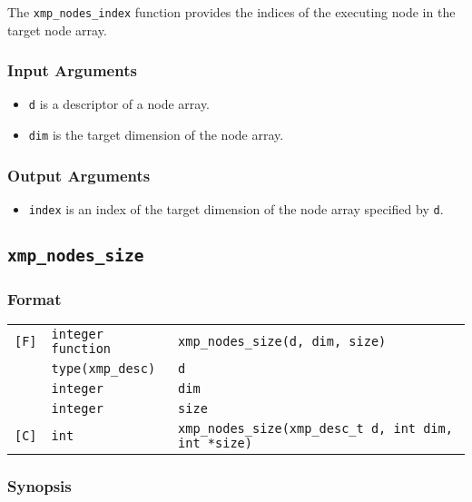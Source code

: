 The {\tt xmp\_nodes\_index} function provides the indices of the
executing node in the target node array.

\subsubsection*{Input Arguments}

\begin{itemize}
 \item {\tt d} is a descriptor of a node array.
 \item {\tt dim} is the target dimension of the node array.
\end{itemize}

\subsubsection*{Output Arguments}

\begin{itemize}
 \item {\tt index} is an index of the target dimension of the node array
       specified by {\tt d}.
\end{itemize}


\subsection{\tt xmp\_nodes\_size}

\subsubsection*{Format}

\begin{tabular}{lll}

\verb![F]!& {\tt integer function}& {\tt xmp\_nodes\_size(d, dim, size)}\\
          & {\tt type(xmp\_desc)} & {\tt d}\\
          & {\tt integer} & {\tt dim}\\
          & {\tt integer} & {\tt size}\\

\verb![C]!&  {\tt int}& {\tt xmp\_nodes\_size(xmp\_desc\_t d, int dim, int *size)}\\

\end{tabular}

\subsubsection*{Synopsis}

